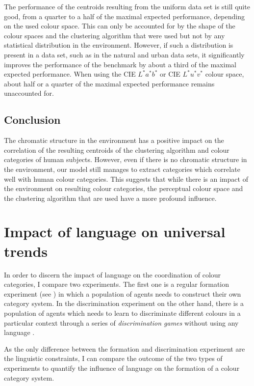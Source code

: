 The performance of the centroids resulting from the uniform data set
is still quite good, from a quarter to a half of the maximal expected
performance, depending on the used colour space. This can only be
accounted for by the shape of the colour spaces and the clustering
algorithm that were used but not by any statistical distribution in
the environment. However, if such a distribution is present in a data
set, such as in the natural and urban data sets, it significantly
improves the performance of the benchmark by about a third of the
maximal expected performance. When using the CIE $L^*a^*b^*$ or CIE
$L^*u^*v^*$ colour space, about half or a quarter of the maximal
expected performance remains unaccounted for.

\subsection{Conclusion}

The chromatic structure in the environment has a positive impact on
the correlation of the resulting centroids of the clustering algorithm
and colour categories of human subjects. However, even if there is no
chromatic structure in the environment, our model still manages to
extract categories which correlate well with human colour
categories. This suggests that while there is an impact of the
environment on resulting colour categories, the perceptual colour
space and the clustering algorithm that are used have a more profound
influence.

\section{Impact of language on universal trends}
\label{s:impact-of-language}

In order to discern the impact of language on the coordination of
colour categories, I compare two experiments. The first one is a
regular formation experiment (see ) in which a population of agents needs to
construct their own category system. In the discrimination experiment
on the other hand, there is a population of agents which needs to learn
to discriminate different colours in a particular context through a
series of \emph{discrimination games} without using any language
\citep{steels97constructing, belpaeme98construction}.

As the only difference between the formation and discrimination
experiment are the linguistic constraints, I can compare the outcome
of the two types of experiments to quantify the influence of language
on the formation of a colour category system.

